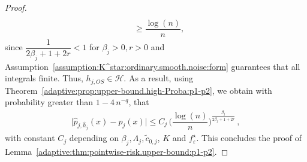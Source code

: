 \documentclass[11pt,a4paper,openany]{article}
\begin{document}
\begin{proof}
\begin{align}
		\nonumber  
		\\
		&\geq  \dfrac{\log(n)}{n}
		, 
		\label{proof:adaptive:corollary:pointwise-risk.upper-bound:p1-p2:h_optimal.in.Hn:verification:ordinary.noise.case}
	\end{align}
	since $\dfrac{1}{2\beta_{j} + 1 + 2 r} < 1$ for $\beta_{j} > 0, r > 0$ and %
	Assumption~\ref{assumption:K^star:ordinary.smooth.noise:form} guarantees that all integrals finite. Thus, $h_{j, OS} \in \mathcal{H}$. 
	As a result, using Theorem~\ref{adaptive:prop:upper-bound.high-Proba:p1-p2}, we obtain %
	with probability greater than $1 - 4 \,  n^{-q}$, that
	\begin{align*}
		\big| \widehat{p}_{j,\widehat{h}_j}(x) - p_{j}(x) \big|   \leq  %
		C_{j} \,  %
		\Big( \dfrac{\log(n)}{n} \Big)^{\frac{ \beta_{j} }{2 \beta_{j} + 1 + 2r }}  \,   ,    
	\end{align*}  
	with  %
	constant $C_{j}$ depending on $\beta_{j}, \Lambda_{j}, \tilde c_{0,j}$, $K$ and  $f_{\varepsilon}^{\star}$. 
	This concludes the proof of Lemma~\ref{adaptive:thm:pointwise-risk.upper-bound:p1-p2}.   
\end{proof}

\bigskip  
\end{document}
